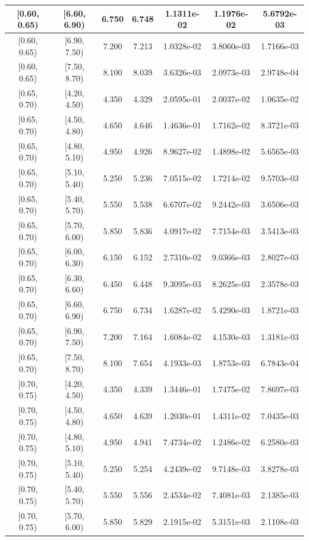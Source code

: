 \begin{longtable}{|c|c|c|c|c|c|c|}
\hline
[0.60, 0.65) & [6.60, 6.90) & 6.750 & 6.748 & 1.1311e-02 & 1.1976e-02 & 5.6792e-03 \\ 
\hline
[0.60, 0.65) & [6.90, 7.50) & 7.200 & 7.213 & 1.0328e-02 & 3.8060e-03 & 1.7166e-03 \\ 
\hline
[0.60, 0.65) & [7.50, 8.70) & 8.100 & 8.039 & 3.6326e-03 & 2.0973e-03 & 2.9748e-04 \\ 
\hline
[0.65, 0.70) & [4.20, 4.50) & 4.350 & 4.329 & 2.0595e-01 & 2.0037e-02 & 1.0635e-02 \\ 
\hline
[0.65, 0.70) & [4.50, 4.80) & 4.650 & 4.646 & 1.4636e-01 & 1.7162e-02 & 8.3721e-03 \\ 
\hline
[0.65, 0.70) & [4.80, 5.10) & 4.950 & 4.926 & 8.9627e-02 & 1.4898e-02 & 5.6565e-03 \\ 
\hline
[0.65, 0.70) & [5.10, 5.40) & 5.250 & 5.236 & 7.0515e-02 & 1.7214e-02 & 9.5703e-03 \\ 
\hline
[0.65, 0.70) & [5.40, 5.70) & 5.550 & 5.538 & 6.6707e-02 & 9.2442e-03 & 3.6506e-03 \\ 
\hline
[0.65, 0.70) & [5.70, 6.00) & 5.850 & 5.836 & 4.0917e-02 & 7.7154e-03 & 3.5413e-03 \\ 
\hline
[0.65, 0.70) & [6.00, 6.30) & 6.150 & 6.152 & 2.7310e-02 & 9.0366e-03 & 2.8027e-03 \\ 
\hline
[0.65, 0.70) & [6.30, 6.60) & 6.450 & 6.448 & 9.3095e-03 & 8.2625e-03 & 2.3578e-03 \\ 
\hline
[0.65, 0.70) & [6.60, 6.90) & 6.750 & 6.734 & 1.6287e-02 & 5.4290e-03 & 1.8721e-03 \\ 
\hline
[0.65, 0.70) & [6.90, 7.50) & 7.200 & 7.164 & 1.6084e-02 & 4.1530e-03 & 1.3181e-03 \\ 
\hline
[0.65, 0.70) & [7.50, 8.70) & 8.100 & 7.654 & 4.1933e-03 & 1.8753e-03 & 6.7843e-04 \\ 
\hline
[0.70, 0.75) & [4.20, 4.50) & 4.350 & 4.339 & 1.3446e-01 & 1.7475e-02 & 7.8697e-03 \\ 
\hline
[0.70, 0.75) & [4.50, 4.80) & 4.650 & 4.639 & 1.2030e-01 & 1.4311e-02 & 7.0435e-03 \\ 
\hline
[0.70, 0.75) & [4.80, 5.10) & 4.950 & 4.941 & 7.4734e-02 & 1.2486e-02 & 6.2580e-03 \\ 
\hline
[0.70, 0.75) & [5.10, 5.40) & 5.250 & 5.254 & 4.2439e-02 & 9.7148e-03 & 3.8278e-03 \\ 
\hline
[0.70, 0.75) & [5.40, 5.70) & 5.550 & 5.556 & 2.4534e-02 & 7.4081e-03 & 2.1385e-03 \\ 
\hline
[0.70, 0.75) & [5.70, 6.00) & 5.850 & 5.829 & 2.1915e-02 & 5.3151e-03 & 2.1108e-03 \\ 

\end{longtable}
